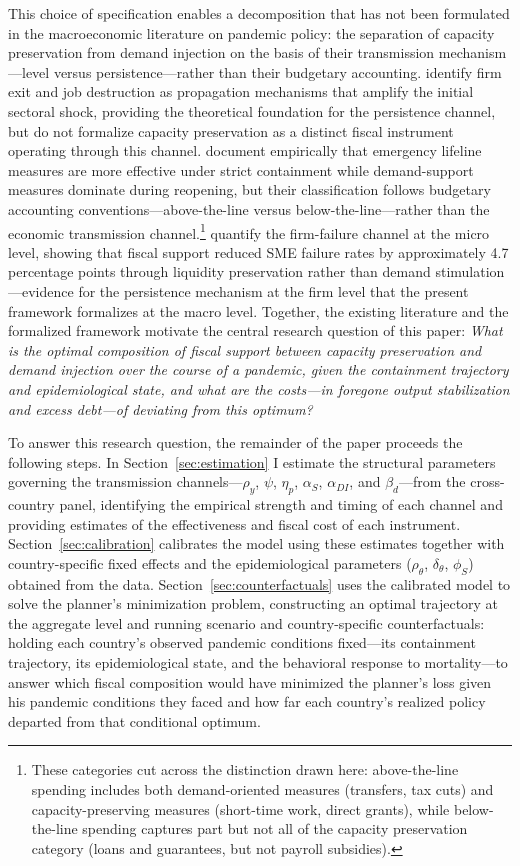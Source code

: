 \documentclass[12pt, a4paper]{article}
\begin{document}
This choice of specification enables a decomposition that has not been formulated in the macroeconomic literature on pandemic policy: the separation of capacity preservation from demand injection on the basis of their transmission mechanism---level versus persistence---rather than their budgetary accounting. \citet{guerrieri2022} identify firm exit and job destruction as propagation mechanisms that amplify the initial sectoral shock, providing the theoretical foundation for the persistence channel, but do not formalize capacity preservation as a distinct fiscal instrument operating through this channel. \citet{deb2021} document empirically that emergency lifeline measures are more effective under strict containment while demand-support measures dominate during reopening, but their classification follows budgetary accounting conventions---above-the-line versus below-the-line---rather than the economic transmission channel.\footnote{These categories cut across the distinction drawn here: above-the-line spending includes both demand-oriented measures (transfers, tax cuts) and capacity-preserving measures (short-time work, direct grants), while below-the-line spending captures part but not all of the capacity preservation category (loans and guarantees, but not payroll subsidies).} \citet{gourinchas2021} quantify the firm-failure channel at the micro level, showing that fiscal support reduced SME failure rates by approximately 4.7 percentage points through liquidity preservation rather than demand stimulation---evidence for the persistence mechanism at the firm level that the present framework formalizes at the macro level. Together, the existing literature and the formalized framework motivate the central research question of this paper: \textit{What is the optimal composition of fiscal support between capacity preservation and demand injection over the course of a pandemic, given the containment trajectory and epidemiological state, and what are the costs—in foregone output stabilization and excess debt—of deviating from this optimum?}

To answer this research question, the remainder of the paper proceeds the following steps. In Section~\ref{sec:estimation} I estimate the structural parameters governing the transmission channels---$\rho_y$, $\psi$, $\eta_p$, $\alpha_S$, $\alpha_{DI}$, and $\beta_d$---from the cross-country panel, identifying the empirical strength and timing of each channel and providing estimates of the effectiveness and fiscal cost of each instrument. Section~\ref{sec:calibration} calibrates the model using these estimates together with country-specific fixed effects and the epidemiological parameters ($\rho_\theta$, $\delta_\theta$, $\phi_S$) obtained from the data. Section~\ref{sec:counterfactuals} uses the calibrated model to solve the planner's minimization problem, constructing an optimal trajectory at the aggregate level and running scenario and country-specific counterfactuals: holding each country's observed pandemic conditions fixed---its containment trajectory, its epidemiological state, and the behavioral response to mortality---to answer which fiscal composition would have minimized the planner's loss given his pandemic conditions they faced and how far each country's realized policy departed from that conditional optimum.
\end{document}
